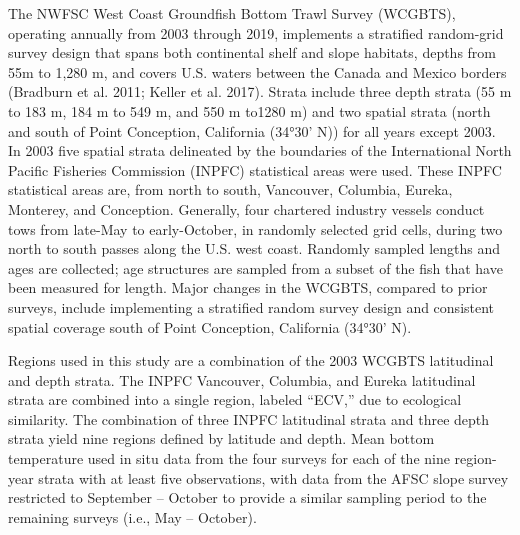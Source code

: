 \documentclass[
]{article}
\begin{document}
The NWFSC West Coast Groundfish Bottom Trawl Survey (WCGBTS), operating
annually from 2003 through 2019, implements a stratified random-grid
survey design that spans both continental shelf and slope habitats,
depths from 55m to 1,280 m, and covers U.S. waters between the Canada
and Mexico borders (Bradburn et al. 2011; Keller et al. 2017). Strata
include three depth strata (55 m to 183 m, 184 m to 549 m, and 550 m
to1280 m) and two spatial strata (north and south of Point Conception,
California (34°30' N)) for all years except 2003. In 2003 five spatial
strata delineated by the boundaries of the International North Pacific
Fisheries Commission (INPFC) statistical areas were used. These INPFC
statistical areas are, from north to south, Vancouver, Columbia, Eureka,
Monterey, and Conception. Generally, four chartered industry vessels
conduct tows from late-May to early-October, in randomly selected grid
cells, during two north to south passes along the U.S. west coast.
Randomly sampled lengths and ages are collected; age structures are
sampled from a subset of the fish that have been measured for length.
Major changes in the WCGBTS, compared to prior surveys, include
implementing a stratified random survey design and consistent spatial
coverage south of Point Conception, California (34°30' N).

Regions used in this study are a combination of the 2003 WCGBTS
latitudinal and depth strata. The INPFC Vancouver, Columbia, and Eureka
latitudinal strata are combined into a single region, labeled ``ECV,''
due to ecological similarity. The combination of three INPFC latitudinal
strata and three depth strata yield nine regions defined by latitude and
depth. Mean bottom temperature used in situ data from the four surveys
for each of the nine region-year strata with at least five observations,
with data from the AFSC slope survey restricted to September -- October
to provide a similar sampling period to the remaining surveys (i.e., May
-- October).
\end{document}
